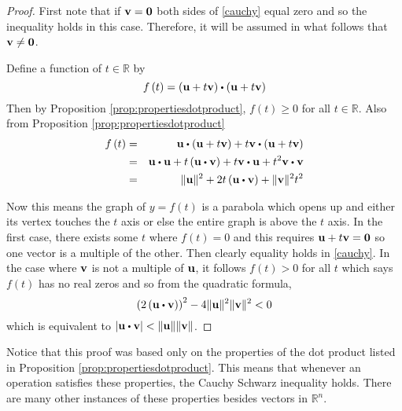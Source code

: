 \begin{proof}
First note that if ${\bf v}={\bf 0}$ both sides of \ref{cauchy}
equal zero and so the inequality holds in this case. Therefore, it will be
assumed in what follows that ${\bf v}\neq {\bf 0}$.

Define a function of $t\in \mathbb{R}$ by 
\begin{equation*}
f\left( t\right) =\left( \vect{u}+t\vect{v}\right) \dotprod \left( \vect{u}+
t\vect{v}\right) 
\end{equation*}
Then by Proposition \ref{prop:propertiesdotproduct}, $f\left( t\right) \geq 0$ for all $t\in \mathbb{R}$.
Also from Proposition \ref{prop:propertiesdotproduct}
\begin{eqnarray*}
f\left( t\right) &=&\vect{u}\dotprod \left( \vect{u}+t\vect{v}\right) +
t\vect{v}\dotprod \left( \vect{u}+t\vect{v}\right) \\
&=&\vect{u}\dotprod \vect{u}+t\left( \vect{u}\dotprod \vect{v}\right) + t \vect{v}\dotprod \vect{u}+
t^{2}\vect{v}\dotprod \vect{v} \\
&=&\vectlength \vect{u}\vectlength ^{2}+2t\left( \vect{u}\dotprod \vect{v}\right) +\vectlength
\vect{v}\vectlength ^{2}t^{2}
\end{eqnarray*}

Now this means the graph of $y=f\left( t\right) $ is a parabola which opens
up and either its vertex touches the $t$ axis or else the entire graph is
above the $t$ axis. In the first case, there exists some $t$ where $f\left(
t\right) =0$ and this requires ${\bf u}+t{\bf v}={\bf 0}$ so one vector is a
multiple of the other. Then clearly equality holds in \ref{cauchy}. In the
case where ${\bf v}$ is not a multiple of ${\bf u}$, it follows 
$f\left( t\right) >0$ for all $t$ which says $f\left( t\right) $ has no real
zeros and so from the quadratic formula,
\begin{equation*}
\left( 2\left( \vect{u}\dotprod \vect{v}\right) \right) ^{2}-4\vectlength \vect{u}
\vectlength ^{2}\vectlength \vect{v}\vectlength ^{2}<0
\end{equation*}
which is equivalent to $\left\vert \vect{u}\dotprod \vect{v} \right\vert
<\vectlength \vect{u}\vectlength \vectlength \vect{v}\vectlength $.
\end{proof}

Notice that this proof was based only on the properties of
the dot product listed in Proposition \ref{prop:propertiesdotproduct}. This means that
whenever an operation satisfies these properties, the Cauchy Schwarz inequality
holds. There are many other instances of these properties besides vectors in
$\mathbb{R}^{n}$.

